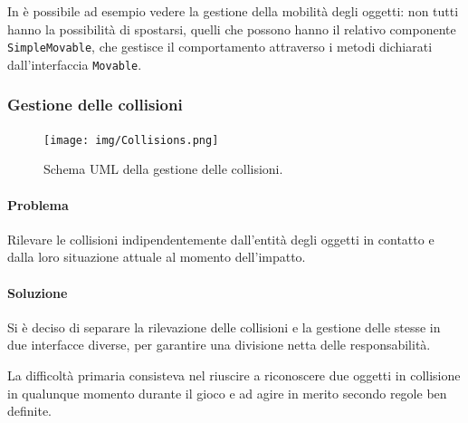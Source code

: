 \documentclass[a4paper,12pt]{report}
\begin{document}
In  è possibile ad esempio vedere la gestione della mobilità degli oggetti: non tutti hanno la possibilità di spostarsi, quelli che possono hanno il relativo componente \texttt{SimpleMovable}, che gestisce il comportamento attraverso i metodi dichiarati dall'interfaccia \texttt{Movable}.
%
\newpage
%
\subsubsection*{Gestione delle collisioni}
%
\begin{figure}[H]
    \centering{}
    \texttt{[image: img/Collisions.png]}
    \caption{Schema UML della gestione delle collisioni.}
\end{figure}
%
\paragraph*{Problema}
Rilevare le collisioni indipendentemente dall'entità degli oggetti in contatto e dalla loro situazione attuale al momento dell'impatto.
\paragraph*{Soluzione}
Si è deciso di separare la rilevazione delle collisioni e la gestione delle stesse in due interfacce diverse, per garantire una divisione netta delle responsabilità.

La difficoltà primaria consisteva nel riuscire a riconoscere due oggetti in collisione in qualunque momento durante il gioco e ad agire in merito secondo regole ben definite.
\end{document}
